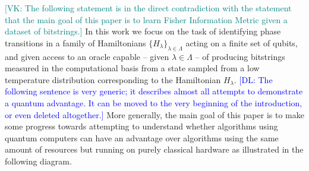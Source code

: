 \documentclass[
  american,aps,pra,reprint,floatfix,nofootinbib,superscriptaddress
]{revtex4-2}
\newcommand{\VK}[1]{\textcolor{teal}{[VK: #1]}}
\newcommand{\DL}[1]{\textcolor{blue}{[DL: #1]}}
\begin{document}
\VK{The following statement is in the direct contradiction with the statement
that the main goal of this paper is to learn Fisher Information Metric
given a dataset of bitstrings.}
In this work we focus on the task of identifying phase transitions in a
family of Hamiltonians $\{H_{\lambda}\}_{\lambda \in \Lambda}$ acting on a finite
set of qubits, and given access to an oracle capable -- given $\lambda \in \Lambda$ --
of producing bitstrings measured in the computational basis from a state sampled
from a low temperature distribution corresponding to the Hamiltonian
$H_{\lambda}$. 
\DL{The following sentence is very generic; it describes almost all attempts to demonstrate a quantum advantage. It can be moved to the very beginning of the introduction, or even deleted altogether.}
More generally,
the main goal of this paper is to make some
progress towards attempting to understand whether algorithms using
quantum computers can have an advantage over algorithms using the
same amount of resources but running on
purely classical hardware as illustrated in the following diagram.
\end{document}
